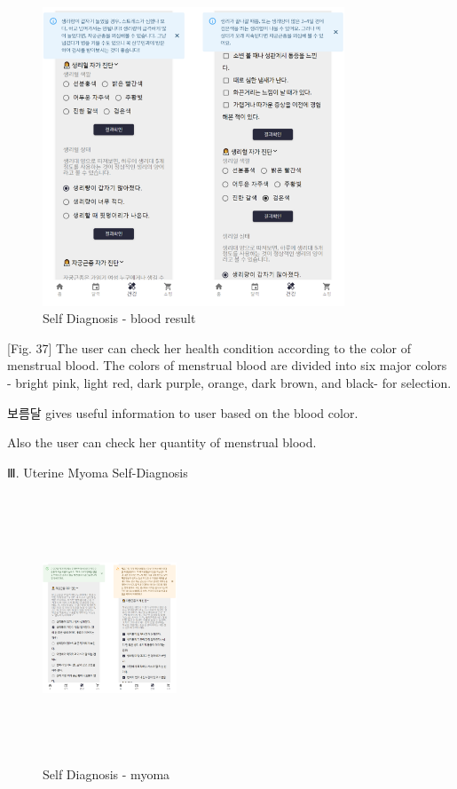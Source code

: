 \documentclass[conference]{IEEEtran}
\begin{document}
\begin{itemize}
\begin{enumerate}
        \begin{figure}[ht]
        \includegraphics[width=9cm, center]{bloodd.PNG}
        \caption{Self Diagnosis - blood result}
        \label{fig38}
        \end{figure}
        
        [Fig. 37] The user can check her health condition according to the color of menstrual blood. 
        The colors of menstrual blood are divided into six major colors - bright pink, light red, dark purple, orange, dark brown, and black- for selection.
        
        보름달 gives useful information to user based on the blood color. 
        
        Also the user can check her quantity of menstrual blood. 
        
        Ⅲ. Uterine Myoma Self-Diagnosis
        
        \begin{figure}[ht]
        \includegraphics[width=4cm, height=8cm, center]{myoma.png}
        \caption{Self Diagnosis - myoma}
        \label{fig 39}
        \end{figure}
        

\end{enumerate}
\end{itemize}
\end{document}
